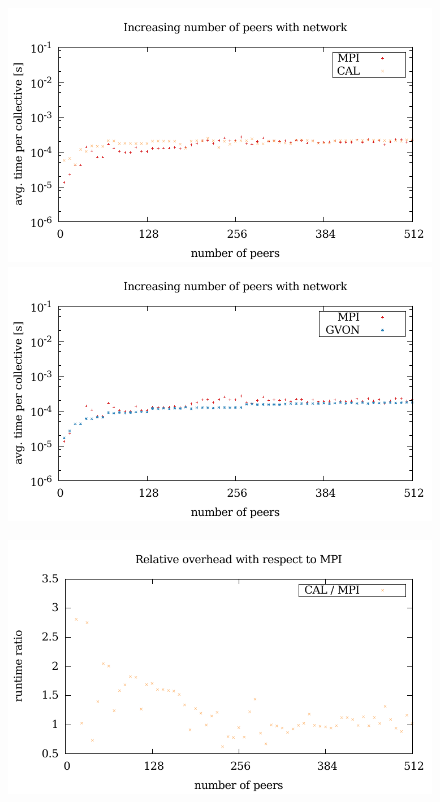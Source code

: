 \begin{figure}[H]
  \begin{minipage}[t]{0.5\textwidth}
    \includegraphics[width=\textwidth]{plots/50_reduce_network_cal_laser}
    \includegraphics[width=\textwidth]{plots/50_reduce_network_gvon_laser}
  \end{minipage}%
  \begin{minipage}[t]{0.5\textwidth}
    \includegraphics[width=\textwidth]{plots/50_reduce_network_overhead_cal_laser}

\end{minipage}
\end{figure}
